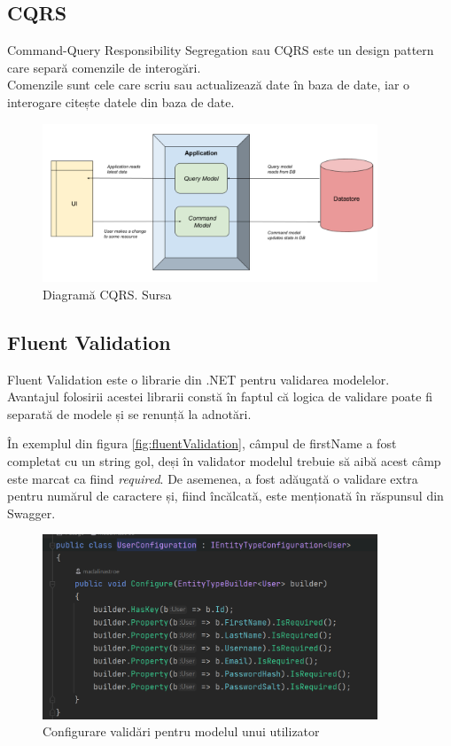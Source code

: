 \subsection{CQRS}
Command-Query Responsibility Segregation sau CQRS este un design pattern care separă comenzile de interogări.\\
Comenzile sunt cele care scriu sau actualizează date în baza de date, iar o interogare citește datele din baza de date.
 
\begin{figure}[H]
	\centering
	\includegraphics[width=100mm, scale=2]{figs/cqrs.png}
    \caption{Diagramă CQRS. Sursa~\cite{CQRS}}
	\label{fig:cqrs}
\end{figure}
\subsection{Fluent Validation}
Fluent Validation este o librarie  din .NET pentru validarea modelelor. \\ 
Avantajul folosirii acestei librarii constă în faptul că logica de validare poate fi separată de modele și se renunță la adnotări.

În exemplul din figura \ref{fig:fluentValidation}, câmpul de firstName a fost completat cu un string gol, deși în validator modelul trebuie să aibă acest câmp este marcat ca fiind {\it required}.
De asemenea, a fost adăugată o validare extra pentru numărul de caractere și, fiind încălcată, este menționată în răspunsul din Swagger.
\begin{figure}[H]
	\centering
	\includegraphics[width=100mm, scale=2]{figs/userConfigValidation.png}
	\caption{Configurare validări pentru modelul unui utilizator}
	\label{fig:userConfigValidation}
\end{figure}

